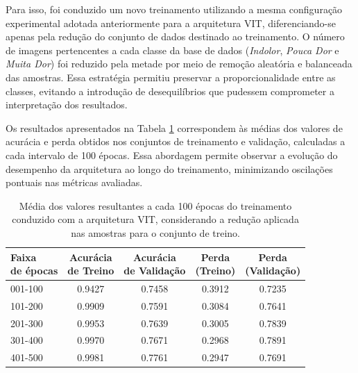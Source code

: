 Para isso, foi conduzido um novo treinamento utilizando a mesma configuração experimental adotada anteriormente para a arquitetura \acs{VIT}, diferenciando-se apenas pela redução do conjunto de dados destinado ao treinamento. O número de imagens pertencentes a cada classe da base de dados (\textit{Indolor}, \textit{Pouca Dor} e \textit{Muita Dor}) foi reduzido pela metade por meio de remoção aleatória e balanceada das amostras. Essa estratégia permitiu preservar a proporcionalidade entre as classes, evitando a introdução de desequilíbrios que pudessem comprometer a interpretação dos resultados.

Os resultados apresentados na Tabela \ref{tab:vit_reduced_data_mean_results} correspondem às médias dos valores de acurácia e perda obtidos nos conjuntos de treinamento e validação, calculadas a cada intervalo de 100 épocas. Essa abordagem permite observar a evolução do desempenho da arquitetura ao longo do treinamento, minimizando oscilações pontuais nas métricas avaliadas.

\begin{table}[h]
	\centering
	\caption{Média dos valores resultantes a cada 100 épocas do treinamento conduzido com a arquitetura \acs{VIT}, considerando a redução aplicada nas amostras para o conjunto de treino.}
	\label{tab:vit_reduced_data_mean_results}
	\begin{tabular}{l|c|c|c|c}
		
		\toprule
		\makecell{\textbf{Faixa} \\ \textbf{de épocas}}&
		\makecell{\textbf{Acurácia}\\ \textbf{de Treino}} &
		\makecell{\textbf{Acurácia}\\ \textbf{de Validação}} &
		\makecell{\textbf{Perda}\\ \textbf{(Treino)}} &
		\makecell{\textbf{Perda}\\ \textbf{(Validação)}} \\
		\midrule
		
		001-100 & 0.9427 & 0.7458 & 0.3912 & 0.7235 \\
		101-200 & 0.9909 & 0.7591 & 0.3084 & 0.7641 \\
		201-300 & 0.9953 & 0.7639 & 0.3005 & 0.7839 \\
		301-400 & 0.9970 & 0.7671 & 0.2968 & 0.7891 \\
		401-500 & 0.9981 & 0.7761 & 0.2947 & 0.7691 \\
		
		\bottomrule
	\end{tabular}
\end{table}

